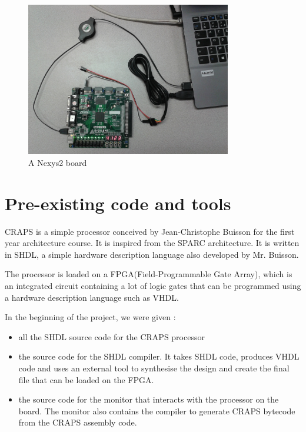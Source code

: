 \documentclass[openany, a4paper]{book}
\begin{document}
      \begin{figure}[h]
        \centering
        \includegraphics[width=0.8\textwidth]{./fig/Nexys2.jpg}
        \caption{A Nexys2 board}
      \end{figure}
    
    \section{Pre-existing code and tools}
     CRAPS is a simple processor conceived by Jean-Christophe Buisson for the
     first year architecture course. It is inspired from the SPARC
     architecture. It is written in SHDL, a simple hardware description
     language also developed by Mr. Buisson.
     
     The processor is loaded on a FPGA(Field-Programmable Gate Array), which is
     an integrated circuit containing a lot of logic gates that can be
     programmed using a hardware description language such as VHDL.

     In the beginning of the project, we were given :
     \begin{itemize}
        \item all the SHDL source code for the CRAPS processor
        \item the source code for the SHDL compiler. It takes SHDL code,
            produces VHDL code and uses an external tool to synthesise the
            design and create the final file that can be loaded on the FPGA.
        \item the source code for the monitor that interacts with the processor
            on the board. The monitor also contains the compiler to generate
            CRAPS bytecode from the CRAPS assembly code.
     \end{itemize}
\end{document}
